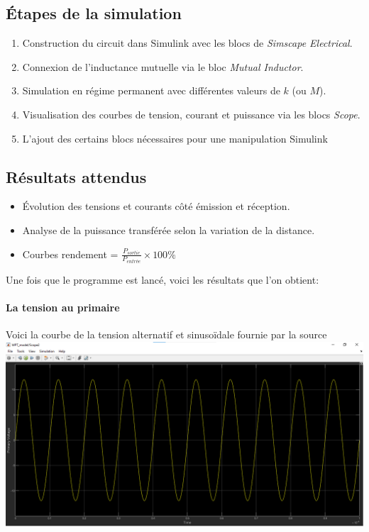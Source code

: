 \documentclass[12pt,a4paper,titlepage,notitlepage]{article}
\begin{document}
	
	\subsection{Étapes de la simulation}
	
	\begin{enumerate}
		\item Construction du circuit dans Simulink avec les blocs de \textit{Simscape Electrical}.
		\item Connexion de l’inductance mutuelle via le bloc \textit{Mutual Inductor}.
		\item Simulation en régime permanent avec différentes valeurs de $k$ (ou $M$).
		\item Visualisation des courbes de tension, courant et puissance via les blocs \textit{Scope}.
		\item L'ajout des certains blocs nécessaires pour une manipulation Simulink
	\end{enumerate}
	
	\subsection{Résultats attendus}
	
	\begin{itemize}
		\item Évolution des tensions et courants côté émission et réception.
		\item Analyse de la puissance transférée selon la variation de la distance.
		\item Courbes rendement = $\frac{P_{sortie}}{P_{entrée}} \times 100\%$
	\end{itemize}
	
	Une fois que le programme est lancé, voici les résultats que l'on obtient:
	
	\paragraph{La tension au primaire\\}
	Voici la courbe de la tension alternatif et sinusoïdale fournie par la source\\ 
	\includegraphics[width=1\textwidth]{WPT_simul_pv}
	
\end{document}
